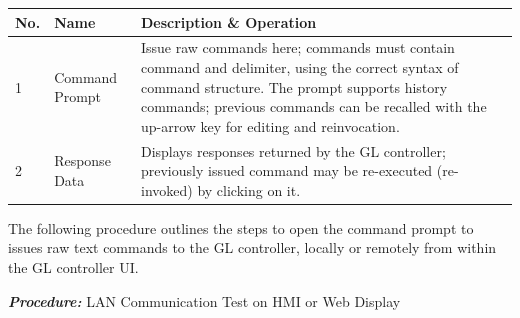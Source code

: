 \begin{longtable}[]{@{}lll@{}}
\toprule
\begin{minipage}[b]{0.04\columnwidth}\raggedright
No.\strut
\end{minipage} & \begin{minipage}[b]{0.23\columnwidth}\raggedright
Name\strut
\end{minipage} & \begin{minipage}[b]{0.65\columnwidth}\raggedright
Description \& Operation\strut
\end{minipage}\tabularnewline
\midrule
\endhead
\begin{minipage}[t]{0.04\columnwidth}\raggedright
1\strut
\end{minipage} & \begin{minipage}[t]{0.23\columnwidth}\raggedright
Command Prompt\strut
\end{minipage} & \begin{minipage}[t]{0.65\columnwidth}\raggedright
Issue raw commands here; commands must contain command and delimiter,
using the correct syntax of command structure. The prompt supports
history commands; previous commands can be recalled with the up-arrow
key for editing and reinvocation.\strut
\end{minipage}\tabularnewline
\begin{minipage}[t]{0.04\columnwidth}\raggedright
2\strut
\end{minipage} & \begin{minipage}[t]{0.23\columnwidth}\raggedright
Response Data\strut
\end{minipage} & \begin{minipage}[t]{0.65\columnwidth}\raggedright
Displays responses returned by the GL controller; previously issued
command may be re-executed (re-invoked) by clicking on it.\strut
\end{minipage}\tabularnewline
\bottomrule
\end{longtable}

The following procedure outlines the steps to open the command prompt to
issues raw text commands to the GL controller, locally or remotely from
within the GL controller UI.

\textbf{\emph{Procedure:}} LAN Communication Test on HMI or Web Display

